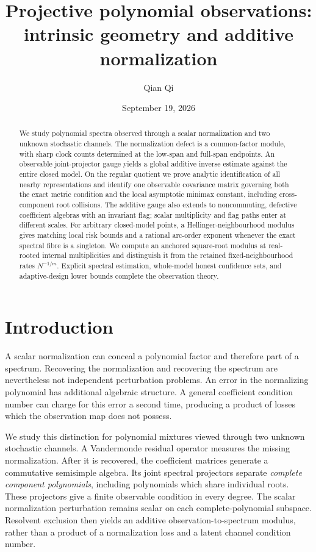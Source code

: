 \documentclass[11pt,reqno]{amsart}
\title[Projective polynomial observations]{Projective polynomial observations:\\ intrinsic geometry and additive normalization}
\author{Qian Qi}
\date{September 19, 2026}
\numberwithin{equation}{section}
\theoremstyle{definition}\newtheorem{definition}[theorem]{Definition}
\theoremstyle{remark}\newtheorem{remark}[theorem]{Remark}
\begin{document}
\begin{abstract}
We study polynomial spectra observed through a scalar normalization and
two unknown stochastic channels. The normalization defect is a common-factor
module, with sharp clock counts determined at the low-span and full-span
endpoints. An observable joint-projector gauge yields a global additive
inverse estimate against the entire closed model. On the regular quotient
we prove analytic identification of all nearby representations and identify
one observable covariance matrix governing both the exact metric condition
and the local asymptotic minimax constant, including cross-component root
collisions. The additive gauge also extends to noncommuting, defective
coefficient algebras with an invariant flag; scalar multiplicity and flag
paths enter at different scales. For arbitrary closed-model points, a
Hellinger-neighbourhood modulus gives matching local risk bounds and a
rational arc-order exponent whenever the exact spectral fibre is a
singleton. We compute an anchored square-root modulus at real-rooted
internal multiplicities and distinguish it from the retained fixed-neighbourhood
rates $N^{-1/m}$. Explicit spectral estimation, whole-model honest confidence
sets, and adaptive-design lower bounds complete the observation theory.
\end{abstract}
\maketitle

\section{Introduction}
A scalar normalization can conceal a polynomial factor and therefore
part of a spectrum. Recovering the normalization and recovering the
spectrum are nevertheless not independent perturbation problems. An
error in the normalizing polynomial has additional algebraic structure.
A general coefficient condition number can charge for this error a
second time, producing a product of losses which the observation map
does not possess.

We study this distinction for polynomial mixtures viewed through two
unknown stochastic channels. A Vandermonde residual operator measures
the missing normalization. After it is recovered, the coefficient
matrices generate a commutative semisimple algebra. Its joint spectral
projectors separate \emph{complete component polynomials}, including
polynomials which share individual roots. These projectors give a
finite observable condition in every degree. The scalar normalization
perturbation remains scalar on each complete-polynomial subspace.
Resolvent exclusion then yields an additive observation-to-spectrum
modulus, rather than a product of a normalization loss and a latent
channel condition number.
\end{document}
